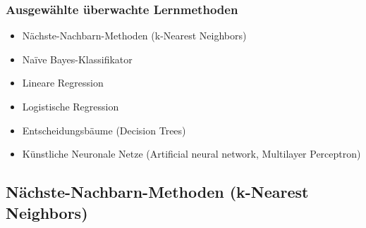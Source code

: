 \documentclass[aspectratio=169]{beamer}
\begin{document}




  


\begin{frame}
  \frametitle{Ausgewählte überwachte Lernmethoden}
  \begin{block}{}
    \begin{center}
      \begin{itemize}
      \item Nächste-Nachbarn-Methoden (k-Nearest Neighbors)
      \item Naïve Bayes-Klassifikator
      \item Lineare Regression
      \item Logistische Regression
      \item Entscheidungsbäume (Decision Trees)
      \item Künstliche Neuronale Netze (Artificial neural network,
        Multilayer Perceptron)
      \end{itemize}
    \end{center}    
  \end{block}
\end{frame}


\subsection{Nächste-Nachbarn-Methoden (k-Nearest Neighbors)}
\end{document}
